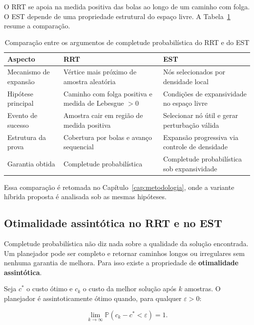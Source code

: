O RRT se apoia na medida positiva das bolas ao longo de um caminho com folga. O EST depende de uma propriedade estrutural do espaço livre. A Tabela~\ref{tab:comparacao_completude_rrt_est} resume a comparação.

\begin{table}[H]
\centering
\caption{Comparação entre os argumentos de completude probabilística do RRT e do EST}
\label{tab:comparacao_completude_rrt_est}
\begin{tabular}{@{}p{3.5cm}p{5.5cm}p{5.5cm}@{}}
\toprule
\textbf{Aspecto} & \textbf{RRT} & \textbf{EST} \\ \midrule
Mecanismo de expansão & Vértice mais próximo de amostra aleatória & Nós selecionados por densidade local \\
Hipótese principal & Caminho com folga positiva e medida de Lebesgue $> 0$ & Condições de expansividade no espaço livre \\
Evento de sucesso & Amostra cair em região de medida positiva & Selecionar nó útil e gerar perturbação válida \\
Estrutura da prova & Cobertura por bolas e avanço sequencial & Expansão progressiva via controle de densidade \\
Garantia obtida & Completude probabilística & Completude probabilística sob expansividade \\ \bottomrule
\end{tabular}
\end{table}

Essa comparação é retomada no Capítulo~\ref{cap:metodologia}, onde a variante híbrida proposta é analisada sob as mesmas hipóteses.

\subsection{Otimalidade assintótica no RRT e no EST}
\label{subsec:otimalidade_rrt_est}

Completude probabilística não diz nada sobre a qualidade da solução encontrada. Um planejador pode ser completo e retornar caminhos longos ou irregulares sem nenhuma garantia de melhora. Para isso existe a propriedade de \textbf{otimalidade assintótica}.

Seja $c^*$ o custo ótimo e $c_k$ o custo da melhor solução após $k$ amostras. O planejador é assintoticamente ótimo quando, para qualquer $\varepsilon > 0$:

\begin{equation}
    \lim_{k \rightarrow \infty}
    \mathbb{P}\left(c_k - c^* < \varepsilon\right) = 1.
    \label{eq:otimalidade_assintotica_rrt_est}
\end{equation}

